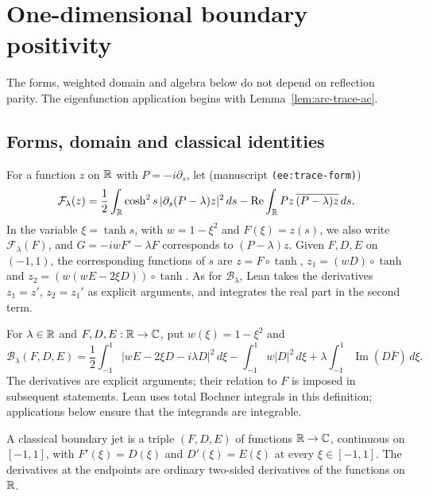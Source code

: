 \section{One-dimensional boundary positivity}
\label{sec:ee-boundary-positivity}

The forms, weighted domain and algebra below do not depend on reflection
parity. The eigenfunction application begins with
Lemma~\ref{lem:arc-trace-ac}.

\subsection{Forms, domain and classical identities}

\begin{definition}
\label{def:boundary-form}
\leanok
For a function $z$ on $\mathbb{R}$ with $P=-i\partial_s$, let
(manuscript \texttt{(ee:trace-form)})
\[
  \mathcal F_\lambda(z)=\frac12\int_{\mathbb{R}}\cosh^2s\,|\partial_s(P-\lambda)z|^2\,ds
  -\operatorname{Re}\int_{\mathbb{R}} Pz\,\overline{(P-\lambda)z}\,ds .
\]
In the variable $\xi=\tanh s$, with $w=1-\xi^2$ and $F(\xi)=z(s)$, we also write
$\mathcal F_\lambda(F)$, and $G=-iwF'-\lambda F$ corresponds to $(P-\lambda)z$.
Given $F,D,E$ on $(-1,1)$, the corresponding functions of $s$ are
$z=F\circ\tanh$, $z_1=(wD)\circ\tanh$ and $z_2=(w(wE-2\xi D))\circ\tanh$.
As for $\mathcal B_\lambda$, Lean takes the derivatives $z_1=z'$, $z_2=z_1'$
as explicit arguments, and integrates the real part in the second term.
\end{definition}

\begin{definition}
\label{def:boundary-form-xi}
\leanok
For $\lambda\in\mathbb{R}$ and $F,D,E:\mathbb{R}\to\mathbb{C}$, put $w(\xi)=1-\xi^2$ and
\[
  \mathcal B_\lambda(F,D,E)
  =\frac12\int_{-1}^1|wE-2\xi D-i\lambda D|^2\,d\xi
   -\int_{-1}^1w|D|^2\,d\xi
   +\lambda\int_{-1}^1\operatorname{Im}(D\bar F)\,d\xi.
\]
The derivatives are explicit arguments; their relation to $F$ is imposed in
subsequent statements. Lean uses total Bochner integrals in this definition;
applications below ensure that the integrands are integrable.
\end{definition}

\begin{definition}
\label{def:boundary-jet}
\leanok
A classical boundary jet is a triple $(F,D,E)$ of functions $\mathbb{R}\to\mathbb{C}$,
continuous on $[-1,1]$, with $F'(\xi)=D(\xi)$ and $D'(\xi)=E(\xi)$ at every
$\xi\in[-1,1]$. The derivatives at the endpoints are ordinary two-sided
derivatives of the functions on $\mathbb{R}$.
\end{definition}

